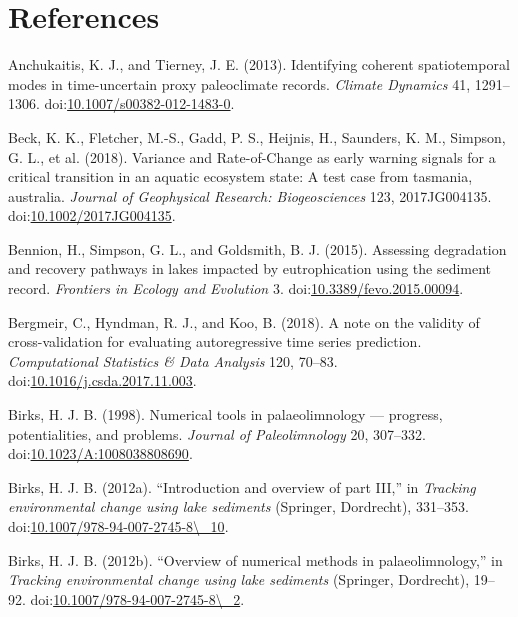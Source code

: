 \documentclass[12pt,]{article}
\begin{document}
\section*{References}\label{references}

\hypertarget{refs}{}
\hypertarget{ref-Anchukaitis2013-la}{}
Anchukaitis, K. J., and Tierney, J. E. (2013). Identifying coherent
spatiotemporal modes in time-uncertain proxy paleoclimate records.
\emph{Climate Dynamics} 41, 1291--1306.
doi:\href{https://doi.org/10.1007/s00382-012-1483-0}{10.1007/s00382-012-1483-0}.

\hypertarget{ref-Beck2018-zm}{}
Beck, K. K., Fletcher, M.-S., Gadd, P. S., Heijnis, H., Saunders, K. M.,
Simpson, G. L., et al. (2018). Variance and Rate-of-Change as early
warning signals for a critical transition in an aquatic ecosystem state:
A test case from tasmania, australia. \emph{Journal of Geophysical
Research: Biogeosciences} 123, 2017JG004135.
doi:\href{https://doi.org/10.1002/2017JG004135}{10.1002/2017JG004135}.

\hypertarget{ref-Bennion2015-ph}{}
Bennion, H., Simpson, G. L., and Goldsmith, B. J. (2015). Assessing
degradation and recovery pathways in lakes impacted by eutrophication
using the sediment record. \emph{Frontiers in Ecology and Evolution} 3.
doi:\href{https://doi.org/10.3389/fevo.2015.00094}{10.3389/fevo.2015.00094}.

\hypertarget{ref-Bergmeir2018-pu}{}
Bergmeir, C., Hyndman, R. J., and Koo, B. (2018). A note on the validity
of cross-validation for evaluating autoregressive time series
prediction. \emph{Computational Statistics \& Data Analysis} 120,
70--83.
doi:\href{https://doi.org/10.1016/j.csda.2017.11.003}{10.1016/j.csda.2017.11.003}.

\hypertarget{ref-Birks1998-po}{}
Birks, H. J. B. (1998). Numerical tools in palaeolimnology --- progress,
potentialities, and problems. \emph{Journal of Paleolimnology} 20,
307--332.
doi:\href{https://doi.org/10.1023/A:1008038808690}{10.1023/A:1008038808690}.

\hypertarget{ref-Birks2012-op}{}
Birks, H. J. B. (2012a). ``Introduction and overview of part III,'' in
\emph{Tracking environmental change using lake sediments} (Springer,
Dordrecht), 331--353.
doi:\href{https://doi.org/10.1007/978-94-007-2745-8/_10}{10.1007/978-94-007-2745-8\textbackslash{}\_10}.

\hypertarget{ref-Birks2012-fa}{}
Birks, H. J. B. (2012b). ``Overview of numerical methods in
palaeolimnology,'' in \emph{Tracking environmental change using lake
sediments} (Springer, Dordrecht), 19--92.
doi:\href{https://doi.org/10.1007/978-94-007-2745-8/_2}{10.1007/978-94-007-2745-8\textbackslash{}\_2}.
\end{document}
